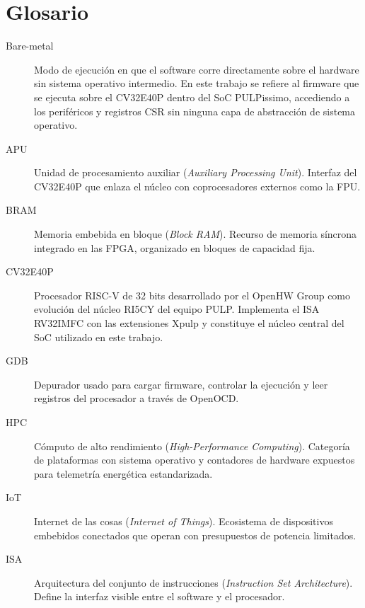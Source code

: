 \chapter*{Glosario}
{}
\thispagestyle{empty}

\begin{description}
  \item[Bare-metal] Modo de ejecución en que el software corre directamente sobre
        el hardware sin sistema operativo intermedio. En este trabajo se refiere
        al firmware que se ejecuta sobre el CV32E40P dentro del SoC PULPissimo,
        accediendo a los periféricos y registros CSR sin ninguna capa de
        abstracción de sistema operativo.

  \item[APU] Unidad de procesamiento auxiliar (\textit{Auxiliary Processing
        Unit}). Interfaz del CV32E40P que enlaza el núcleo con coprocesadores
        externos como la FPU.

  \item[BRAM] Memoria embebida en bloque (\textit{Block RAM}). Recurso de
        memoria síncrona integrado en las FPGA, organizado en bloques de
        capacidad fija.

  \item[CV32E40P] Procesador RISC-V de 32 bits desarrollado por el OpenHW Group
        como evolución del núcleo RI5CY del equipo PULP. Implementa el ISA
        RV32IMFC con las extensiones Xpulp y constituye el núcleo central del
        SoC utilizado en este trabajo.

  \item[GDB] Depurador usado para cargar firmware, controlar la ejecución y leer
        registros del procesador a través de OpenOCD.

  \item[HPC] Cómputo de alto rendimiento (\textit{High-Performance Computing}).
        Categoría de plataformas con sistema operativo y contadores de hardware
        expuestos para telemetría energética estandarizada.

  \item[IoT] Internet de las cosas (\textit{Internet of Things}). Ecosistema de
        dispositivos embebidos conectados que operan con presupuestos de potencia
        limitados.

  \item[ISA] Arquitectura del conjunto de instrucciones
        (\textit{Instruction Set Architecture}). Define la interfaz visible entre
        el software y el procesador.


\end{description}
